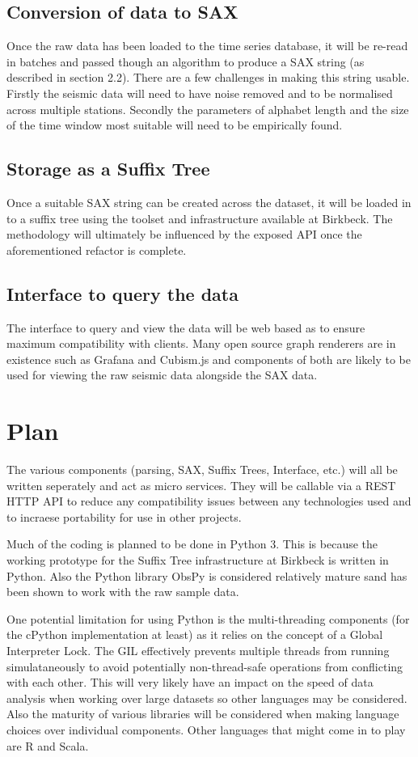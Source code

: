 \documentclass[11pt]{scrartcl}
\begin{document}
\subsection{Conversion of data to SAX}
	Once the raw data has been loaded to the time series database, it will be re-read in batches and passed though an algorithm to produce a SAX string (as described in section 2.2).  There are a few challenges in making this string usable.  Firstly the seismic data will need to have noise removed and to be normalised across multiple stations.  Secondly the parameters of alphabet length and the size of the time window most suitable will need to be empirically found.
	
\subsection{Storage as a Suffix Tree}
	Once a suitable SAX string can be created across the dataset, it will be loaded in to a suffix tree using the toolset and infrastructure available at Birkbeck.  The methodology will ultimately be influenced by the exposed API once the aforementioned refactor is complete.

\subsection{Interface to query the data}
	The interface to query and view the data will be web based as to ensure maximum compatibility with clients.  Many open source graph renderers are in existence such as Grafana and Cubism.js and components of both are likely to be used for viewing the raw seismic data alongside the SAX data.

\section{Plan}
	The various components (parsing, SAX, Suffix Trees, Interface, etc.) will all be written seperately and act as micro services.  They will be callable via a REST HTTP API to reduce any compatibility issues between any technologies used and to incraese portability for use in other projects.

	Much of the coding is planned to be done in Python 3.  This is because the working prototype for the Suffix Tree infrastructure at Birkbeck is written in Python.  Also the Python library ObsPy is considered relatively mature sand has been shown to work with the raw sample data.
	
	One potential limitation for using Python is the multi-threading components (for the cPython implementation at least) as it relies on the concept of a Global Interpreter Lock.  The GIL effectively prevents multiple threads from running simulataneously to avoid potentially non-thread-safe operations from conflicting with each other.  This will very likely have an impact on the speed of data analysis when working over large datasets so other languages may be considered.  Also the maturity of various libraries will be considered when making language choices over individual components.  Other languages that might come in to play are R and Scala.
	
\end{document}
